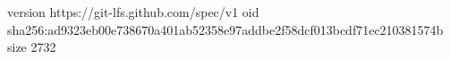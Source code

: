 version https://git-lfs.github.com/spec/v1
oid sha256:ad9323eb00e738670a401ab52358e97addbe2f58dcf013bcdf71ec210381574b
size 2732
